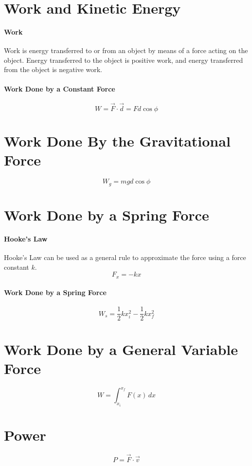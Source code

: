 \documentclass{article}
\begin{document}
    \section{Work and Kinetic Energy}

        \paragraph{Work}
        Work is energy transferred to or from an object by means of a force acting on the object. Energy transferred to the object is positive work, and energy transferred from the object is negative work.

        \paragraph{Work Done by a Constant Force}
        \begin{equation}
            W = \vec{F} \cdot \vec{d} = F d \cos{\phi}
        \end{equation}

    \section{Work Done By the Gravitational Force}

        \begin{equation}
            W_g = m g d \cos{\phi}
        \end{equation}

    \section{Work Done by a Spring Force}

        \paragraph{Hooke's Law}
        Hooke's Law can be used as a general rule to approximate the force using a force constant $k$.
        \begin{equation}
            F_x = -k x
        \end{equation}

        \paragraph{Work Done by a Spring Force}
        \begin{equation}
            W_s = \frac{1}{2} k x_i^2 - \frac{1}{2} k x_f^2
        \end{equation}

    \section{Work Done by a General Variable Force}

        \begin{equation}
            W = \int_{x_i}^{x_f} F(x) \, dx
        \end{equation}

    \section{Power}

        \begin{equation}
            P = \vec{F} \cdot \vec{v}
        \end{equation}
\end{document}
